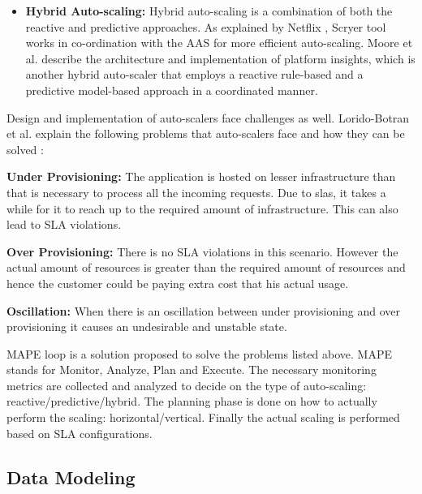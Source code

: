 \documentclass[article,type=msc,colorback,12pt,accentcolor=tud8b,table]{tudthesis}
\begin{document}
\begin{itemize}
\item{\textbf{Hybrid Auto-scaling: }} Hybrid auto-scaling is a combination of both the reactive and predictive approaches. As explained by Netflix \cite{Scryer1}, Scryer tool works in co-ordination with the AAS for more efficient auto-scaling. Moore et al.\cite{moore2013coordinated} describe the architecture and implementation of platform insights, which is another hybrid auto-scaler that employs a reactive rule-based and a predictive model-based approach in a coordinated manner.
\end{itemize}
Design and implementation of auto-scalers face challenges as well. Lorido-Botran et al. explain the following problems that auto-scalers face and how they can be solved \cite{lorido2014review}:
\begin{description}
	\item{\textbf{Under Provisioning:}} The application is hosted on lesser infrastructure than that is necessary to process all the incoming requests. Due to \gls{sla}s, it takes a while for it to reach up to the required amount of infrastructure. This can also lead to SLA violations.
	
	\item{\textbf{Over Provisioning:}} There is no SLA violations in this scenario. However the actual amount of resources is greater than the required amount of resources and hence the customer could be paying extra cost that his actual usage.
	
	\item{\textbf{Oscillation:}}
		When there is an oscillation between under provisioning and over provisioning it causes an undesirable and unstable state. 
\end{description}

MAPE loop is a solution proposed to solve the problems listed above\cite{lorido2014review}. MAPE stands for Monitor, Analyze, Plan and Execute. The necessary monitoring metrics are collected and analyzed to decide on the type of auto-scaling: reactive/predictive/hybrid. The planning phase is done on how to actually perform the scaling: horizontal/vertical. Finally the actual scaling is performed based on SLA configurations.

	\subsection{Data Modeling}
	
\end{document}
